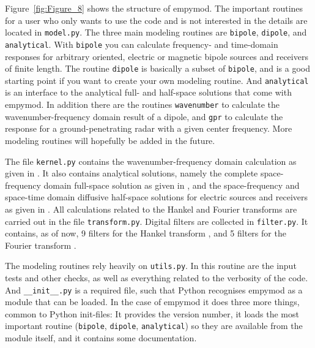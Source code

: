 \documentclass[manuscript,revised]{geophysics}
\begin{document}

Figure~\ref{fig:Figure_8} shows the structure of empymod.%
%
%
%
The important routines for a user who only wants to use the code and is not
interested in the details are located in \texttt{model.py}. The three main
modeling routines are \texttt{bipole}, \texttt{dipole}, and
\texttt{analytical}. With \texttt{bipole} you can calculate frequency- and
time-domain responses for arbitrary oriented, electric or magnetic bipole
sources and receivers of finite length. The routine \texttt{dipole} is
basically a subset of \texttt{bipole}, and is a good starting point if you want
to create your own modeling routine. And \texttt{analytical} is an interface to
the analytical full- and half-space solutions that come with empymod. In
addition there are the routines \texttt{wavenumber} to calculate the
wavenumber-frequency domain result of a dipole, and \texttt{gpr} to calculate
the response for a ground-penetrating radar with a given center frequency. More
modeling routines will hopefully be added in the future.

The file \texttt{kernel.py} contains the wavenumber-frequency domain
calculation as given in \cite{GEO.16.Hunziker}. It also contains analytical
solutions, namely the complete space-frequency domain full-space solution as
given in \cite{GEO.16.Hunziker}, and the space-frequency and space-time domain
diffusive half-space solutions for electric sources and receivers as given in
\cite{PIER.10.Slob}. All calculations related to the Hankel and Fourier
transforms are carried out in the file \texttt{transform.py}.  Digital filters
are collected in \texttt{filter.py}. It contains, as of now, 9 filters for the
Hankel transform \citep{TMS.82.Anderson, GEO.12.Key, GEO.09.Key, GP.07.Kong},
and 5 filters for the Fourier transform \citep{GEO.12.Key, GEO.09.Key}.

The modeling routines rely heavily on \texttt{utils.py}. In this routine are
the input tests and other checks, as well as everything related to the
verbosity of the code.  And \texttt{\_\_init\_\_.py} is a required file, such
that Python recognises empymod as a module that can be loaded. In the case of
empymod it does three more things, common to Python init-files: It provides the
version number, it loads the most important routine (\texttt{bipole},
\texttt{dipole}, \texttt{analytical}) so they are available from the module
itself, and it contains some documentation.
\end{document}

